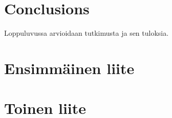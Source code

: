 \documentclass[final]{jyflluk}
\begin{document}
\begin{otherlanguage}{english}
\section{Conclusions}
\label{sec:conclusions}

Loppuluvussa arvioidaan tutkimusta ja sen tuloksia.

\nocite{*}

\appendix

\section{Ensimmäinen liite}
\label{sec:ensimmainen-liite}

\section{Toinen liite}
\label{sec:toinen-liite}

\end{otherlanguage}
\end{document}
